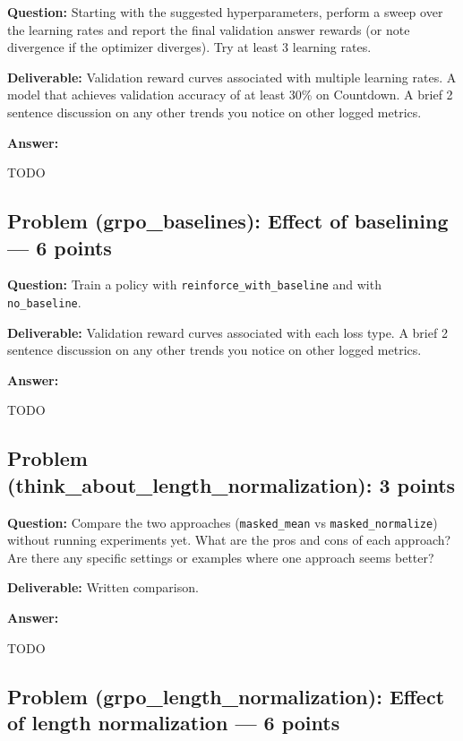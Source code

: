 \documentclass[11pt]{article}
\begin{document}
\textbf{Question:} Starting with the suggested hyperparameters, perform a sweep over the learning rates and report the final validation answer rewards (or note divergence if the optimizer diverges). Try at least 3 learning rates.

\textbf{Deliverable:} Validation reward curves associated with multiple learning rates. A model that achieves validation accuracy of at least 30\% on Countdown. A brief 2 sentence discussion on any other trends you notice on other logged metrics.

\textbf{Answer:}


TODO

\subsection*{Problem (grpo\_baselines): Effect of baselining --- 6 points}

\textbf{Question:} Train a policy with \texttt{reinforce\_with\_baseline} and with \texttt{no\_baseline}.

\textbf{Deliverable:} Validation reward curves associated with each loss type. A brief 2 sentence discussion on any other trends you notice on other logged metrics.

\textbf{Answer:}


TODO

\subsection*{Problem (think\_about\_length\_normalization): 3 points}

\textbf{Question:} Compare the two approaches (\texttt{masked\_mean} vs \texttt{masked\_normalize}) without running experiments yet. What are the pros and cons of each approach? Are there any specific settings or examples where one approach seems better?

\textbf{Deliverable:} Written comparison.

\textbf{Answer:}

TODO

\subsection*{Problem (grpo\_length\_normalization): Effect of length normalization --- 6 points}
\end{document}

